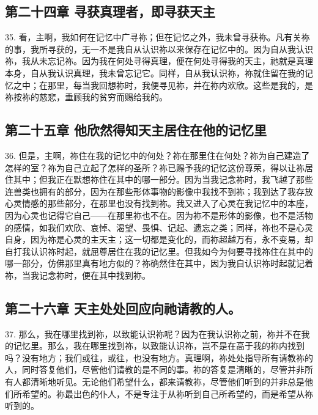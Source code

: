 \subsection{第二十四章 寻获真理者，即寻获天主}

35. 看，主啊，我如何在记忆中广寻祢；但在记忆之外，我未曾寻获祢。凡有关祢的事，我所寻获的，无一不是我自从认识祢以来保存在记忆中的。因为自从我认识祢，我从未忘记祢。因为我在何处寻得真理，便在何处寻得我的天主，祂就是真理本身，自从我认识真理，我未曾忘记它。同样，自从我认识祢，祢就住留在我的记忆之中；在那里，每当我回想祢时，我便寻见祢，并在祢内欢欣。这些是我的，是祢按祢的慈悲，垂顾我的贫穷而赐给我的。\par


\subsection{第二十五章 他欣然得知天主居住在他的记忆里}

36. 但是，主啊，祢住在我的记忆中的何处？祢在那里住在何处？祢为自己建造了怎样的室？祢为自己立起了怎样的圣所？祢已赐予我的记忆这份尊荣，得以让祢居住其中；但我正在默想祢住在其中的哪一部分。因为当我记念祢时，我飞越了那些连兽类也拥有的部分，因为在那些形体事物的影像中我找不到祢；我到达了我存放心灵情感的那些部分，在那里也没有找到祢。我又进入了心灵在我记忆中的本座，因为心灵也记得它自己——在那里祢也不在。因为祢不是形体的影像，也不是活物的感情，如我们欢欣、哀悼、渴望、畏惧、记起、遗忘之类；同样，祢也不是心灵自身，因为祢是心灵的主天主；这一切都是变化的，而祢超越万有，永不变易，却自打我认识祢时起，就屈尊居住在我的记忆里。但我如今为何要寻找祢住在其中的哪一部分，仿佛那里真有地方似的？祢确然住在其中，因为我自认识祢时起就记着祢，当我记念祢时，便在其中找到祢。\par


\subsection{第二十六章 天主处处回应向祂请教的人。}

37. 那么，我在哪里找到祢，以致能认识祢呢？因为在我认识祢之前，祢并不在我的记忆里。那么，我在哪里找到祢，以致能认识祢，岂不是在高于我的祢内找到吗？没有地方；我们或往，或往，也没有地方。真理啊，祢处处指导所有请教祢的人，同时答复他们，尽管他们请教的是不同的事。祢的答复是清晰的，尽管并非所有人都清晰地听见。无论他们希望什么，都来请教祢，尽管他们听到的并非总是他们所希望的。祢最出色的仆人，不是专注于从祢听到自己所希望的，而是希望从祢听到的。\par

